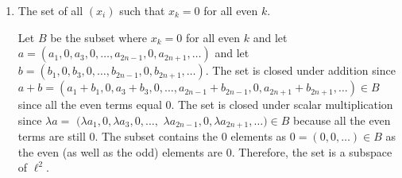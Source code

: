 \documentclass[12pt,letterpaper,reqno]{amsart}
\begin{document}
\begin{enumerate}[1.]
\begin{enumerate}
\begin{flushleft}
\end{flushleft}
\item The set of all $(x_i)$ such that $x_k=0$ for all even $k$.
\begin{flushleft}
Let $B$ be the subset where $x_k=0$ for all even $k$ and let $a = (a_1, 0, a_3, 0, \ldots, a_{2n-1}, 0, a_{2n+1}, \ldots)$ and let $b = (b_1, 0, b_3, 0, \ldots, b_{2n-1}, 0, b_{2n+1}, \ldots)$. The set is closed under addition since $a + b = (a_1 + b_1, 0, a_3 + b_3, 0, \ldots, a_{2n-1} + b_{2n-1}, 0, a_{2n+1} + b_{2n+1}, \ldots) \in B$ since all the even terms equal 0. The set is closed under scalar multiplication since $\lambda a =$ $(\lambda a_1, 0, \lambda a_3, 0, \ldots,$ $\lambda a_{2n-1}, 0, \lambda a_{2n+1}, \ldots) \in B$ because all the even terms are still 0. The subset contains the 0 elements as $0 = (0, 0, \ldots ) \in B$ as the even (as well as the odd) elements are 0. Therefore, the set is a subspace of $\ell^2$.
\end{flushleft}
\end{enumerate}

\end{enumerate}
\end{document}
